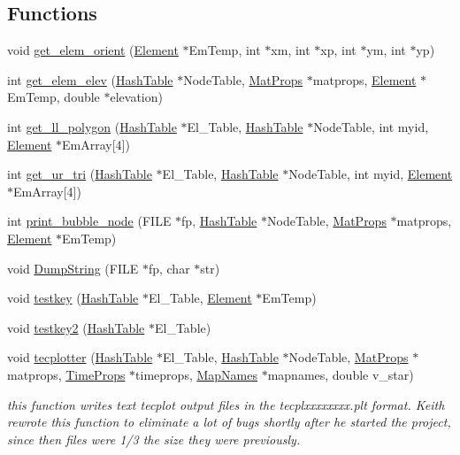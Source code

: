 \subsection*{Functions}
\begin{CompactItemize}
\item 
void \hyperlink{tecplot_8C_a3}{get\_\-elem\_\-orient} (\hyperlink{classElement}{Element} $\ast$Em\-Temp, int $\ast$xm, int $\ast$xp, int $\ast$ym, int $\ast$yp)
\item 
int \hyperlink{tecplot_8C_a4}{get\_\-elem\_\-elev} (\hyperlink{classHashTable}{Hash\-Table} $\ast$Node\-Table, \hyperlink{structMatProps}{Mat\-Props} $\ast$matprops, \hyperlink{classElement}{Element} $\ast$Em\-Temp, double $\ast$elevation)
\item 
int \hyperlink{tecplot_8C_a5}{get\_\-ll\_\-polygon} (\hyperlink{classHashTable}{Hash\-Table} $\ast$El\_\-Table, \hyperlink{classHashTable}{Hash\-Table} $\ast$Node\-Table, int myid, \hyperlink{classElement}{Element} $\ast$Em\-Array\mbox{[}4\mbox{]})
\item 
int \hyperlink{tecplot_8C_a6}{get\_\-ur\_\-tri} (\hyperlink{classHashTable}{Hash\-Table} $\ast$El\_\-Table, \hyperlink{classHashTable}{Hash\-Table} $\ast$Node\-Table, int myid, \hyperlink{classElement}{Element} $\ast$Em\-Array\mbox{[}4\mbox{]})
\item 
int \hyperlink{tecplot_8C_a7}{print\_\-bubble\_\-node} (FILE $\ast$fp, \hyperlink{classHashTable}{Hash\-Table} $\ast$Node\-Table, \hyperlink{structMatProps}{Mat\-Props} $\ast$matprops, \hyperlink{classElement}{Element} $\ast$Em\-Temp)
\item 
void \hyperlink{tecplot_8C_a8}{Dump\-String} (FILE $\ast$fp, char $\ast$str)
\item 
void \hyperlink{tecplot_8C_a9}{testkey} (\hyperlink{classHashTable}{Hash\-Table} $\ast$El\_\-Table, \hyperlink{classElement}{Element} $\ast$Em\-Temp)
\item 
void \hyperlink{tecplot_8C_a10}{testkey2} (\hyperlink{classHashTable}{Hash\-Table} $\ast$El\_\-Table)
\item 
void \hyperlink{tecplot_8C_a11}{tecplotter} (\hyperlink{classHashTable}{Hash\-Table} $\ast$El\_\-Table, \hyperlink{classHashTable}{Hash\-Table} $\ast$Node\-Table, \hyperlink{structMatProps}{Mat\-Props} $\ast$matprops, \hyperlink{structTimeProps}{Time\-Props} $\ast$timeprops, \hyperlink{structMapNames}{Map\-Names} $\ast$mapnames, double v\_\-star)
\begin{CompactList}\small\item\em this function writes text tecplot output files in the tecplxxxxxxxx.plt format. Keith rewrote this function to eliminate a lot of bugs shortly after he started the project, since then files were 1/3 the size they were previously. \item\end{CompactList}\item 

\end{CompactItemize}
